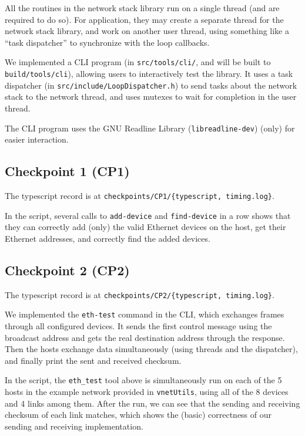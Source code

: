 \documentclass[a4paper]{article}
\begin{document}
  All the routines in the network stack library run on a single thread (and are required to do so).
  For application, they may create a separate thread for the network stack library, and work on another user thread, using something like a ``task dispatcher'' to synchronize with the loop callbacks.

  We implemented a CLI program (in \texttt{src/tools/cli/}, and will be built to \texttt{build/tools/cli}), allowing users to interactively test the library.
  It uses a task dispatcher (in \texttt{src/include/LoopDispatcher.h}) to send tasks about the network stack to the network thread, and uses mutexes to wait for completion in the user thread.

  The CLI program uses the GNU Readline Library (\texttt{libreadline-dev}) (only) for easier interaction.

  \subsection{Checkpoint 1 (CP1)}

  The typescript record is at \texttt{checkpoints/CP1/\{typescript, timing.log\}}.

  In the script, several calls to \texttt{add-device} and \texttt{find-device} in a row shows that they can correctly add (only) the valid Ethernet devices on the host, get their Ethernet addresses, and correctly find the added devices.

  \subsection{Checkpoint 2 (CP2)}

  The typescript record is at \texttt{checkpoints/CP2/\{typescript, timing.log\}}.

  We implemented the \texttt{eth-test} command in the CLI, which exchanges frames through all configured devices.
  It sends the first control message using the broadcast address and gets the real destination address through the response.
  Then the hosts exchange data simultaneously (using threads and the dispatcher), and finally print the sent and received checksum.

  In the script, the \texttt{eth\_test} tool above is simultaneously run on each of the 5 hosts in the example network provided in \texttt{vnetUtils}, using all of the 8 devices and 4 links among them.
  After the run, we can see that the sending and receiving checksum of each link matches, which shows the (basic) correctness of our sending and receiving implementation.
\end{document}
